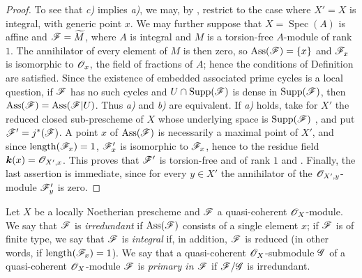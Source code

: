 \begin{proof}
To see that \emph{c)} implies \emph{a)}, we may, by , restrict to the case where $X'=X$ is integral, with generic point $x$.  We may further suppose that $X=\operatorname{Spec}(A)$ is affine and $\mathscr{F}=\widetilde{M}$, where $A$ is integral and $M$ is a torsion-free $A$-module of rank $1$.  The annihilator of every element of $M$ is then zero, so $\operatorname{Ass}(\mathscr{F})=\{x\}$ and $\mathscr{F}_x$ is isomorphic to $\mathscr{O}_x$, the field of fractions of $A$; hence the conditions of Definition  are satisfied.
Since the existence of embedded associated prime cycles is a local question, if $\mathscr{F}$ has no such cycles and $U\cap\operatorname{Supp}(\mathscr{F})$ is dense in $\operatorname{Supp}(\mathscr{F})$, then $\operatorname{Ass}(\mathscr{F})=\operatorname{Ass}(\mathscr{F}|U)$.  Thus \emph{a)} and \emph{b)} are equivalent.
If \emph{a)} holds, take for $X'$ the reduced closed sub-prescheme of $X$ whose underlying space is $\operatorname{Supp}(\mathscr{F})$ , and put $\mathscr{F}'=j^*(\mathscr{F})$.  A point $x$ of $\operatorname{Ass}(\mathscr{F})$ is necessarily a maximal point of $X'$, and since $\operatorname{length}(\mathscr{F}_x)=1$, $\mathscr{F}'_x$ is isomorphic to $\mathscr{F}_x$, hence to the residue field $\boldsymbol{k}(x)=\mathscr{O}_{X',x}$.  This proves that $\mathscr{F}'$ is torsion-free and of rank $1$  and .
Finally, the last assertion is immediate, since for every $y\in X'$ the annihilator of the $\mathscr{O}_{X',y}$-module $\mathscr{F}'_y$ is zero.
\end{proof}

\begin{definition}[3.2.4]
\label{IV.3.2.4}
Let $X$ be a locally Noetherian prescheme and $\mathscr{F}$ a quasi-coherent $\mathscr{O}_X$-module.
We say that $\mathscr{F}$ is \emph{irredundant} if $\operatorname{Ass}(\mathscr{F})$ consists of a single element $x$; if $\mathscr{F}$ is of finite type, we say that $\mathscr{F}$ is \emph{integral} if, in addition, $\mathscr{F}$ is reduced (in other words, if $\operatorname{length}(\mathscr{F}_x)=1$).
We say that a quasi-coherent $\mathscr{O}_X$-submodule $\mathscr{G}$ of a quasi-coherent $\mathscr{O}_X$-module $\mathscr{F}$ is \emph{primary in $\mathscr{F}$} if $\mathscr{F}/\mathscr{G}$ is irredundant.
\end{definition}

